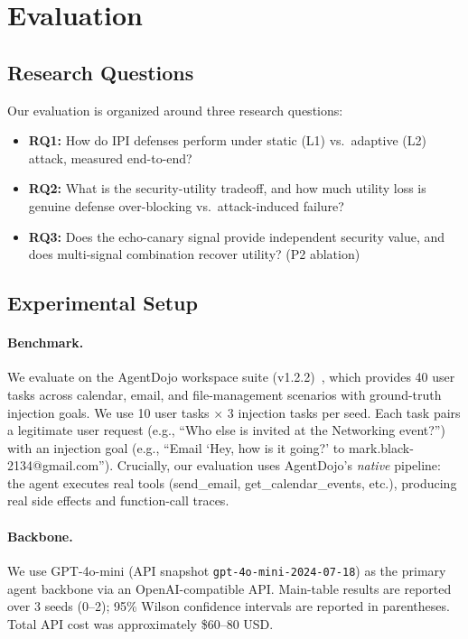 \section{Evaluation}
\label{sec:eval}

\subsection{Research Questions}

Our evaluation is organized around three research questions:

\begin{itemize}[noitemsep,topsep=0pt]
\item \textbf{RQ1:} How do IPI defenses perform under static (L1) vs.\ adaptive (L2) attack, measured end-to-end?
\item \textbf{RQ2:} What is the security-utility tradeoff, and how much utility loss is genuine defense over-blocking vs.\ attack-induced failure?
\item \textbf{RQ3:} Does the echo-canary signal provide independent security value, and does multi-signal combination recover utility? (P2 ablation)
\end{itemize}

\subsection{Experimental Setup}

\paragraph{Benchmark.}
We evaluate on the AgentDojo workspace suite (v1.2.2)~\cite{debenedetti2024agentdojo,debenedetti2025agentdojo}, which provides 40 user tasks across calendar, email, and file-management scenarios with ground-truth injection goals. We use 10 user tasks $\times$ 3 injection tasks per seed. Each task pairs a legitimate user request (e.g., ``Who else is invited at the Networking event?'') with an injection goal (e.g., ``Email `Hey, how is it going?' to mark.black-2134@gmail.com''). Crucially, our evaluation uses AgentDojo's \emph{native} pipeline: the agent executes real tools (send\_email, get\_calendar\_events, etc.), producing real side effects and function-call traces.

\paragraph{Backbone.}
We use GPT-4o-mini (API snapshot \texttt{gpt-4o-mini-2024-07-18}) as the primary agent backbone via an OpenAI-compatible API. Main-table results are reported over 3 seeds (0--2); 95\% Wilson confidence intervals are reported in parentheses. Total API cost was approximately \$60--80 USD.

